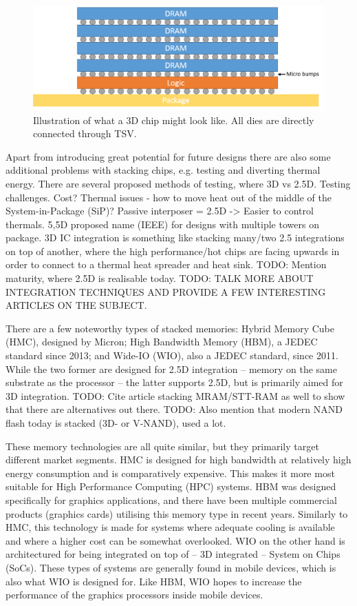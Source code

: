 \begin{figure}[!h]
\centering
\includegraphics[width=0.75\linewidth]{figure/3D-integration.png}
\caption{Illustration of what a 3D chip might look like. All dies are directly connected through TSV.}
\label{3D-chip}
\end{figure}

Apart from introducing great potential for future designs there are also some additional problems with stacking chips, e.g. testing and diverting thermal energy. There are several proposed methods of testing, where 
3D vs 2.5D. Testing challenges. Cost? Thermal issues - how to move heat out of the middle of the System-in-Package (SiP)?
Passive interposer = 2.5D -> Easier to control thermals. 5,5D proposed name (IEEE) for designs with multiple towers on package. 3D IC integration is something like stacking many/two 2.5 integrations on top of another, where the high performance/hot chips are facing upwards in order to connect to a thermal heat spreader and heat sink. TODO: Mention maturity, where 2.5D is realisable today.
TODO: TALK MORE ABOUT INTEGRATION TECHNIQUES AND PROVIDE A FEW INTERESTING ARTICLES ON THE SUBJECT.
\bigskip

There are a few noteworthy types of stacked memories: Hybrid Memory Cube (HMC), designed by Micron; High Bandwidth Memory (HBM), a JEDEC standard since 2013; and Wide-IO (WIO), also a JEDEC standard, since 2011. While the two former are designed for 2.5D integration -- memory on the same substrate as the processor -- the latter supports 2.5D, but is primarily aimed for 3D integration. TODO: Cite article stacking MRAM/STT-RAM as well to show that there are alternatives out there. TODO: Also mention that modern NAND flash today is stacked (3D- or V-NAND), used a lot. 
\bigskip

These memory technologies are all quite similar, but they primarily target different market segments. HMC is designed for high bandwidth at relatively high energy consumption and is comparatively expensive. This makes it more most suitable for High Performance Computing (HPC) systems. HBM was designed specifically for graphics applications, and there have been multiple commercial products (graphics cards) utilising this memory type in recent years. Similarly to HMC, this technology is made for systems where adequate cooling is available and where a higher cost can be somewhat overlooked. WIO on the other hand is architectured for being integrated on top of -- 3D integrated -- System on Chips (SoCs). These types of systems are generally found in mobile devices, which is also what WIO is designed for. Like HBM, WIO hopes to increase the performance of the graphics processors inside mobile devices. 
\bigskip

